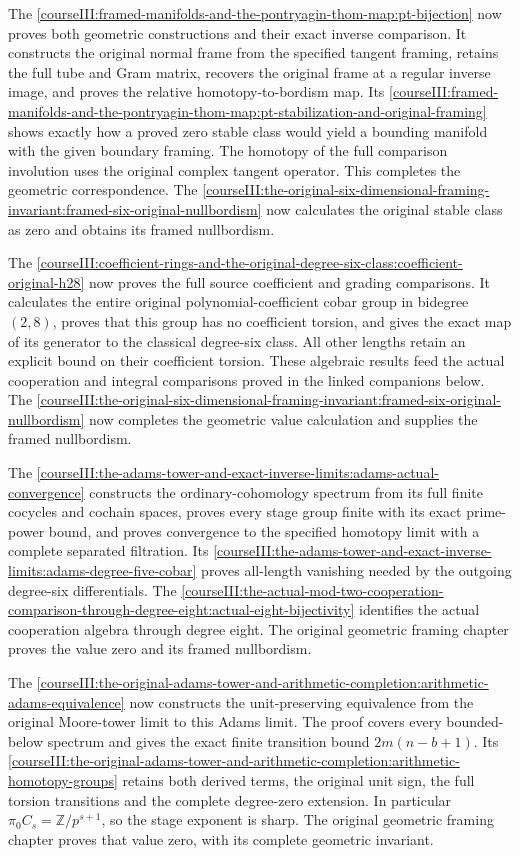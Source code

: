The \cref{courseIII:framed-manifolds-and-the-pontryagin-thom-map:pt-bijection} now proves both geometric constructions and their exact inverse comparison. It constructs the original normal frame from the specified tangent framing, retains the full tube and Gram matrix, recovers the original frame at a regular inverse image, and proves the relative homotopy-to-bordism map. Its \cref{courseIII:framed-manifolds-and-the-pontryagin-thom-map:pt-stabilization-and-original-framing} shows exactly how a proved zero stable class would yield a bounding manifold with the given boundary framing. The homotopy of the full comparison involution uses the original complex tangent operator. This completes the geometric correspondence. The \cref{courseIII:the-original-six-dimensional-framing-invariant:framed-six-original-nullbordism} now calculates the original stable class as zero and obtains its framed nullbordism.

The \cref{courseIII:coefficient-rings-and-the-original-degree-six-class:coefficient-original-h28} now proves the full source coefficient and grading comparisons. It calculates the entire original polynomial-coefficient cobar group in bidegree \((2,8)\), proves that this group has no coefficient torsion, and gives the exact map of its generator to the classical degree-six class. All other lengths retain an explicit bound on their coefficient torsion. These algebraic results feed the actual cooperation and integral comparisons proved in the linked companions below. The \cref{courseIII:the-original-six-dimensional-framing-invariant:framed-six-original-nullbordism} now completes the geometric value calculation and supplies the framed nullbordism.

The \cref{courseIII:the-adams-tower-and-exact-inverse-limits:adams-actual-convergence} constructs the ordinary-cohomology spectrum from its full finite cocycles and cochain spaces, proves every stage group finite with its exact prime-power bound, and proves convergence to the specified homotopy limit with a complete separated filtration. Its \cref{courseIII:the-adams-tower-and-exact-inverse-limits:adams-degree-five-cobar} proves all-length vanishing needed by the outgoing degree-six differentials. The \cref{courseIII:the-actual-mod-two-cooperation-comparison-through-degree-eight:actual-eight-bijectivity} identifies the actual cooperation algebra through degree eight. The original geometric framing chapter proves the value zero and its framed nullbordism.

The \cref{courseIII:the-original-adams-tower-and-arithmetic-completion:arithmetic-adams-equivalence} now constructs the unit-preserving equivalence from the original Moore-tower limit to this Adams limit. The proof covers every bounded-below spectrum and gives the exact finite transition bound \(2m(n-b+1)\). Its \cref{courseIII:the-original-adams-tower-and-arithmetic-completion:arithmetic-homotopy-groups} retains both derived terms, the original unit sign, the full torsion transitions and the complete degree-zero extension. In particular \(\pi_0C_s=\mathbb Z/p^{s+1}\), so the stage exponent is sharp. The original geometric framing chapter proves that value zero, with its complete geometric invariant.

